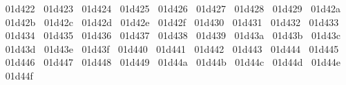 {  ^^^^^^01d422%
  ^^^^^^01d423%
  ^^^^^^01d424%
  ^^^^^^01d425%
  ^^^^^^01d426%
  ^^^^^^01d427%
  ^^^^^^01d428%
  ^^^^^^01d429%
  ^^^^^^01d42a%
  ^^^^^^01d42b%
  ^^^^^^01d42c%
  ^^^^^^01d42d%
  ^^^^^^01d42e%
  ^^^^^^01d42f%
  ^^^^^^01d430%
  ^^^^^^01d431%
  ^^^^^^01d432%
  ^^^^^^01d433%
  ^^^^^^01d434%
  ^^^^^^01d435%
  ^^^^^^01d436%
  ^^^^^^01d437%
  ^^^^^^01d438%
  ^^^^^^01d439%
  ^^^^^^01d43a%
  ^^^^^^01d43b%
  ^^^^^^01d43c%
  ^^^^^^01d43d%
  ^^^^^^01d43e%
  ^^^^^^01d43f%
  ^^^^^^01d440%
  ^^^^^^01d441%
  ^^^^^^01d442%
  ^^^^^^01d443%
  ^^^^^^01d444%
  ^^^^^^01d445%
  ^^^^^^01d446%
  ^^^^^^01d447%
  ^^^^^^01d448%
  ^^^^^^01d449%
  ^^^^^^01d44a%
  ^^^^^^01d44b%
  ^^^^^^01d44c%
  ^^^^^^01d44d%
  ^^^^^^01d44e%
  ^^^^^^01d44f%
}
